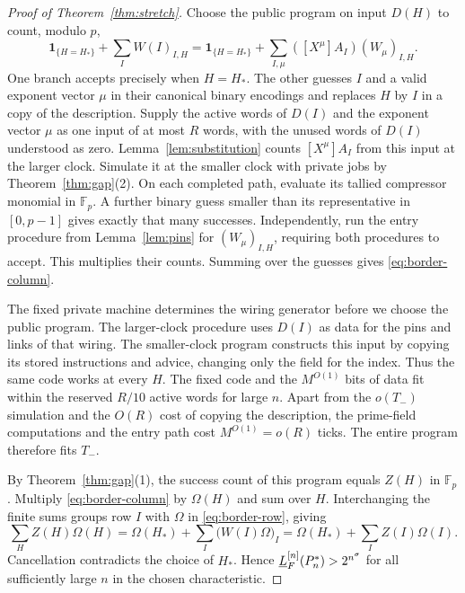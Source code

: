 \begin{proof}[Proof of Theorem~\ref{thm:stretch}]
Choose the public program on input $D(H)$ to count, modulo $p$,
\begin{equation}\label{eq:border-column}
  \mathbf 1_{\{H=H_*\}}+\sum_I W(I)_{I,H}
  =\mathbf 1_{\{H=H_*\}}+
       \sum_{I,\mu}([X^\mu]A_I)(W_\mu)_{I,H}.
\end{equation}
One branch accepts precisely when $H=H_*$. The other guesses $I$ and
a valid exponent vector $\mu$ in their canonical binary encodings and
replaces $H$ by $I$ in a copy of the description. Supply the active
words of $D(I)$ and the exponent vector $\mu$ as one input of at most
$R$ words, with the unused words of $D(I)$ understood as zero.
Lemma~\ref{lem:substitution} counts $[X^\mu]A_I$ from this input at
the larger clock. Simulate it
at the smaller clock with private jobs by Theorem~\ref{thm:gap}(2).
On each completed path, evaluate its tallied compressor monomial in
$\mathbb F_p$. A further binary guess smaller than its representative
in $[0,p-1]$ gives exactly that many successes. Independently, run the
entry procedure from Lemma~\ref{lem:pins} for $(W_\mu)_{I,H}$, requiring
both procedures to accept. This multiplies their counts. Summing over
the guesses gives \eqref{eq:border-column}.

The fixed private machine determines the wiring generator before we
choose the public program. The larger-clock procedure uses $D(I)$ as
data for the pins and links of that wiring. The smaller-clock program
constructs this input by copying its stored instructions and advice,
changing only the field for the index. Thus the same code works at
every $H$. The fixed code and the $M^{O(1)}$ bits of data fit within
the reserved $R/10$ active words for large $n$. Apart from the
$o(T_-)$ simulation and the $O(R)$ cost of copying the description,
the prime-field computations and the entry path cost $M^{O(1)}=o(R)$
ticks. The entire program therefore fits $T_-$.

By Theorem~\ref{thm:gap}(1), the success count of this program equals
$Z(H)$ in $\mathbb F_p$. Multiply \eqref{eq:border-column} by
$\Omega(H)$ and sum over $H$. Interchanging the finite sums groups
row $I$ with $\Omega$ in \eqref{eq:border-row}, giving
\[
 \sum_H Z(H)\Omega(H)
 =\Omega(H_*)+\sum_I\bigl(W(I)\Omega\bigr)_I
 =\Omega(H_*)+\sum_I Z(I)\Omega(I).
\]
Cancellation contradicts the choice of $H_*$. Hence
$\underline L_F^{[n]}(P_n^*)>2^{n^\sigma}$ for all sufficiently large $n$
in the chosen characteristic.


\end{proof}

